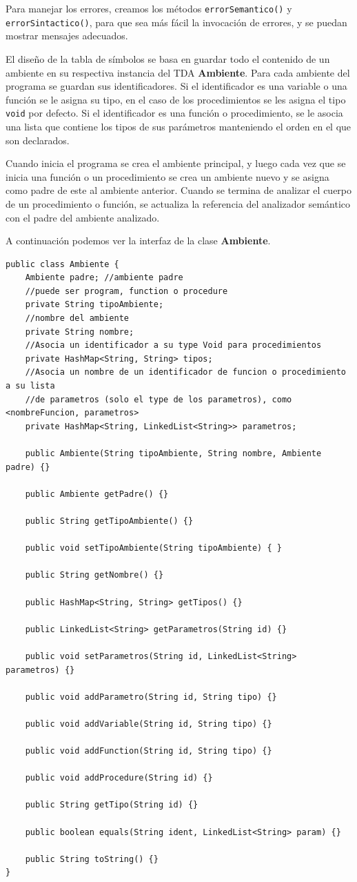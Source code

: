 Para manejar los errores, creamos los métodos \texttt{errorSemantico()} y \texttt{errorSintactico()}, para que sea más fácil la invocación de errores, y se puedan mostrar mensajes adecuados.

El diseño de la tabla de símbolos se basa en guardar todo el contenido de un ambiente en su respectiva instancia del TDA \textbf{Ambiente}. Para cada ambiente del programa se guardan sus identificadores. Si el identificador es una variable o una función se le asigna su tipo, en el caso de los procedimientos se les asigna el tipo \texttt{void} por defecto. Si el identificador es una función o procedimiento, se le asocia una lista que contiene los tipos de sus parámetros manteniendo el orden en el que son declarados.

Cuando inicia el programa se crea el ambiente principal, y luego cada vez que se inicia una función o un procedimiento se crea un ambiente nuevo y se asigna como padre de este al ambiente anterior. Cuando se termina de analizar el cuerpo de un procedimiento o función, se actualiza la referencia del analizador semántico con el padre del ambiente analizado.

A continuación podemos ver la interfaz de la clase \textbf{Ambiente}.

\begin{verbatim}
public class Ambiente {
	Ambiente padre; //ambiente padre
	//puede ser program, function o procedure
	private String tipoAmbiente;
	//nombre del ambiente
	private String nombre;
	//Asocia un identificador a su type Void para procedimientos
	private HashMap<String, String> tipos;
	//Asocia un nombre de un identificador de funcion o procedimiento a su lista 
	//de parametros (solo el type de los parametros), como <nombreFuncion, parametros>
	private HashMap<String, LinkedList<String>> parametros;

	public Ambiente(String tipoAmbiente, String nombre, Ambiente padre) {}

	public Ambiente getPadre() {}

	public String getTipoAmbiente() {}

	public void setTipoAmbiente(String tipoAmbiente) { }

	public String getNombre() {}

	public HashMap<String, String> getTipos() {}

	public LinkedList<String> getParametros(String id) {}

	public void setParametros(String id, LinkedList<String> parametros) {}

	public void addParametro(String id, String tipo) {}

	public void addVariable(String id, String tipo) {}

	public void addFunction(String id, String tipo) {}

	public void addProcedure(String id) {}

	public String getTipo(String id) {}

	public boolean equals(String ident, LinkedList<String> param) {}

	public String toString() {}
}
\end{verbatim}

